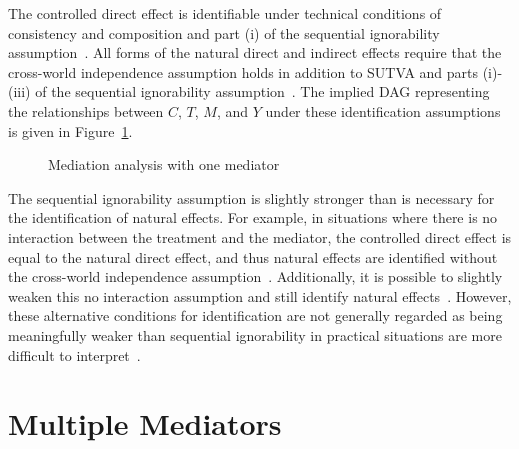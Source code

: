The controlled direct effect is identifiable under technical conditions of consistency and composition and part (i) of 
the sequential ignorability assumption~\citep{imaietal2010b}. All forms of the natural direct and indirect effects require 
that the cross-world independence assumption holds in addition to SUTVA and parts (i)-(iii) of the
sequential ignorability assumption~\citep{pearl2001, imaietal2010a}. The implied DAG representing
the relationships between $C$, $T$, $M$, and $Y$ under these identification assumptions is given in 
Figure~\ref{fig:one_mediator_dag}. 


\begin{figure}[ht]
\centering
{}
\caption{Mediation analysis with one mediator}
\label{fig:one_mediator_dag}
\end{figure}

The sequential ignorability assumption is slightly stronger than is necessary for the identification of 
natural effects. For example, in situations where there is no interaction between the treatment and the mediator,
the controlled direct effect is equal to the natural direct effect, and thus natural effects are identified without
the cross-world independence assumption~\citep{robins2003}. Additionally, it is possible to slightly weaken this no
interaction assumption and still identify natural effects~\citep{petersenetal2006}. However, these alternative conditions
for identification are not generally regarded as being meaningfully weaker than sequential ignorability in practical 
situations are more difficult to interpret~\citep{petersenetal2006, imaietal2010a}. 

\section{Multiple Mediators}\label{subsection:natural_effects_mm}

